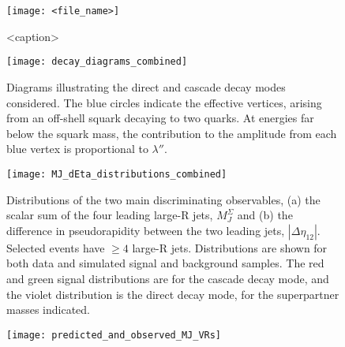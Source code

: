 
\begin{figure}[h]
\texttt{[image: <file\_name>]}
\caption{<caption>}
\label{fig:<figure_label>}
\end{figure}






\begin{figure}[h]
\texttt{[image: decay\_diagrams\_combined]}
\caption{Diagrams illustrating the direct and cascade decay modes considered. The blue circles indicate the effective vertices, arising from an off-shell squark decaying to two quarks. At energies far below the squark mass, the contribution to the amplitude from each blue vertex is proportional to $\lambda''$.}
\label{fig:decay_diagrams}
\end{figure}

\begin{figure}[h]
\texttt{[image: MJ\_dEta\_distributions\_combined]}
\caption{Distributions of the two main discriminating observables, (a) the scalar sum of the four leading large-R jets, $M_{J}^{\Sigma}$ and (b) the difference in pseudorapidity between the two leading jets, $|\Delta\eta_{12}|$. Selected events have $\geq 4$ large-R jets. Distributions are shown for both data and simulated signal and background samples. The red and green signal distributions are for the cascade decay mode, and the violet distribution is the direct decay mode, for the superpartner masses indicated.}
\label{fig:MJ_dEta_distributions}
\end{figure}

\begin{figure}[h]
\texttt{[image: predicted\_and\_observed\_MJ\_VRs]}
\caption{}
\label{fig:pred_obs_MJ_VRs}
\end{figure}



